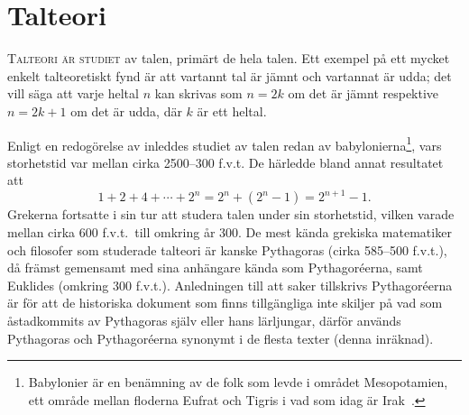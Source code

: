 \chapter{Talteori}%
\label{ch:Talteori}%
\lettrine{T}{alteori är studiet} av talen, primärt de hela talen.
Ett exempel på ett mycket enkelt talteoretiskt fynd är att vartannt tal är 
jämnt och vartannat är udda; det vill säga att varje heltal \(n\) kan skrivas 
som \(n = 2k\) om det är jämnt respektive \(n = 2k+1\) om det är udda, där 
\(k\) är ett heltal.

Enligt en redogörelse av \citet{Kline1990mtf1} inleddes studiet av talen redan 
av babylonierna\footnote{%
  Babylonier är en benämning av de folk som levde i området Mesopotamien, ett 
  område mellan floderna Eufrat och Tigris i vad som idag är 
  Irak~\cite{Kline1990mtf1}.
}, vars storhetstid var mellan cirka 2500--300 f.v.t.\@
De härledde bland annat resultatet att \[1 + 2 + 4 + \cdots + 2^n = 2^n + (2^n 
- 1) = 2^{n+1} - 1.\]
Grekerna fortsatte i sin tur att studera talen under sin storhetstid, vilken 
varade mellan cirka 600 f.v.t.\ till omkring år 300.
De mest kända grekiska matematiker och filosofer som studerade talteori är 
kanske Pythagoras (cirka 585--500 f.v.t.), då främst 
gemensamt med sina anhängare kända som Pythagoréerna, samt 
Euklides (omkring 300 f.v.t.).
Anledningen till att saker tillskrivs Pythagoréerna är för att de historiska 
dokument som finns tillgängliga inte skiljer på vad som åstadkommits av 
Pythagoras själv eller hans lärljungar, därför används Pythagoras och 
Pythagoréerna synonymt i de flesta texter (denna inräknad).

